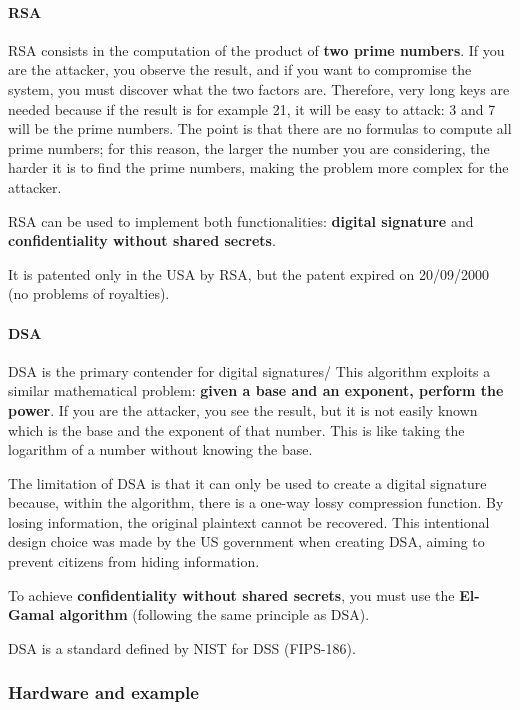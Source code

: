 \paragraph{RSA}
RSA consists in the computation of the product of \textbf{two prime numbers}. If you are the attacker, you observe the
result, and if you want to compromise the system, you must discover what the two factors are. Therefore, very long
keys are needed because if the result is for example 21, it will be easy to attack: 3 and 7 will be the prime numbers. The point is that there are no formulas to compute all prime numbers; for this reason, the larger the number you
are considering, the harder it is to find the prime numbers, making the problem more complex for the attacker.

RSA can be used to implement both functionalities: \textbf{digital signature} and \textbf{confidentiality without shared secrets}.

It is patented only in the USA
by RSA, but the patent expired on 20/09/2000 (no problems of royalties).


\paragraph{DSA}
DSA is the primary contender for digital signatures/ This algorithm exploits a similar mathematical problem: \textbf{given a base and an exponent, perform the power}. If you are the attacker, you see the result, but it is not easily known which is the base and the exponent of that number. This is like taking the logarithm of a number without knowing the base.

The limitation of DSA is that it can only be used to create a digital signature because, within the algorithm, there is a one-way lossy compression function. By losing information, the original plaintext cannot be recovered. This intentional design choice was made by the US government when creating DSA, aiming to prevent citizens from hiding information.

To achieve \textbf{confidentiality without shared secrets}, you must use the \textbf{El-Gamal algorithm} (following the same principle as DSA).

DSA is a standard defined by NIST for DSS (FIPS-186).



\subsubsection*{Hardware and example}

